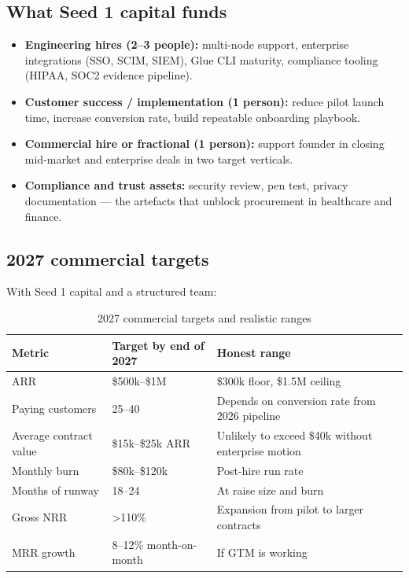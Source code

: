 \subsection{What Seed 1 capital funds}

\begin{itemize}[leftmargin=1.5em,itemsep=3pt]
  \item \textbf{Engineering hires (2--3 people):} multi-node support, enterprise
        integrations (SSO, SCIM, SIEM), Glue CLI maturity, compliance tooling
        (HIPAA, SOC2 evidence pipeline).
  \item \textbf{Customer success / implementation (1 person):} reduce pilot
        launch time, increase conversion rate, build repeatable onboarding playbook.
  \item \textbf{Commercial hire or fractional (1 person):} support founder in
        closing mid-market and enterprise deals in two target verticals.
  \item \textbf{Compliance and trust assets:} security review, pen test, privacy
        documentation — the artefacts that unblock procurement in healthcare and
        finance.
\end{itemize}

\subsection{2027 commercial targets}

With Seed 1 capital and a structured team:

\begin{table}[H]
\centering
\renewcommand{\arraystretch}{1.45}
\begin{tabularx}{\textwidth}{@{}lXX@{}}
\toprule
\textbf{Metric} & \textbf{Target by end of 2027} & \textbf{Honest range} \\
\midrule
ARR & \$500k--\$1M & \$300k floor, \$1.5M ceiling \\
Paying customers & 25--40 & Depends on conversion rate from 2026 pipeline \\
Average contract value & \$15k--\$25k ARR & Unlikely to exceed \$40k without enterprise motion \\
Monthly burn & \$80k--\$120k & Post-hire run rate \\
Months of runway & 18--24 & At raise size and burn \\
Gross NRR & \textgreater{}110\% & Expansion from pilot to larger contracts \\
MRR growth & 8--12\% month-on-month & If GTM is working \\
\bottomrule
\end{tabularx}
\caption{2027 commercial targets and realistic ranges}
\end{table}

